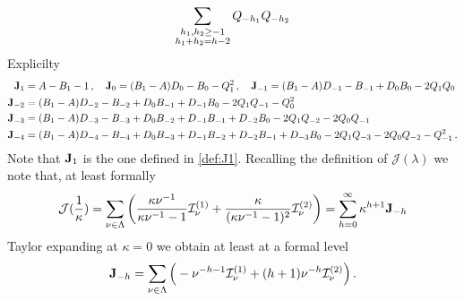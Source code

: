 \documentclass[reqno,11pt]{amsart}
\theoremstyle{plain}
\numberwithin{equation}{section}
\newcommand{\I}{{\texttt{\bf J}}}
\newcommand{\cI}{{\mathcal I}}
\begin{document}
{\begin{equation*}
	\sum_{\substack{h_1,h_2\geq -1\\ h_1+h_2= h-2}} Q_{-h_1} Q_{-h_2}\\
\end{equation*} 
Explicilty
\begin{align*}
	\I_{1} &= A - B_{1} - 1 \,,\quad 	\I_{0}= (B_1-A)D_{0} - B_{0} - Q_{1}^2 \,,\quad 
	\I_{-1} = (B_1-A)D_{-1}- B_{-1}+ D_{0}B_{0}  - 2Q_{1}Q_{0} \\
	\I_{-2} &= (B_1-A)D_{-2}- B_{-2}+ D_{0}B_{-1} + D_{-1}B_{0}  - 2Q_{1}Q_{-1} - Q_{0}^2\\
	\I_{-3} &= (B_1-A)D_{-3}- B_{-3} + D_{0}B_{-2} + D_{-1}B_{-1} + D_{-2}B_{0}  - 2Q_{1}Q_{-2} - 2Q_{0}Q_{-1} \\
	\I_{-4} &= (B_1-A)D_{-4}- B_{-4}  + D_{0}B_{-3} + D_{-1}B_{-2} + D_{-2}B_{-1} + D_{-3}B_{0}  - 2Q_{1}Q_{-3} - 2Q_{0}Q_{-2} - Q_{-1}^2\,.
\end{align*}
Note that $\I_1$ is the one defined in \eqref{def:J1}.
Recalling the definition of $\mathcal J(\lambda)$ we note that, at least formally
\[
\mathcal J(\frac1\kappa)= %
\sum_{\nu \in \Lambda} \left( \frac{\kappa \nu^{-1}}{\kappa\nu^{-1} - 1} \mathcal I_\nu^{(1)} + \frac{\kappa}{ (\kappa\nu^{-1} -  1)^2} \mathcal I_\nu^{(2)} \right)= \sum_{h=0}^\infty \kappa^{h+1} \I_{-h}
\]
Taylor expanding at $\kappa=0$ we obtain at least at a formal level
\begin{equation}\label{Inegative}
	\I_{-h}= \sum_{\nu\in \Lambda} \Big(- \nu^{-h-1}\cI_\nu^{(1)} + (h+1) \nu^{-h} \cI^{(2)}_\nu\Big)\,.
\end{equation}

}
\end{document}
